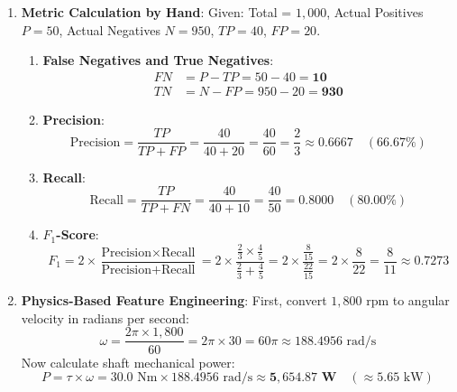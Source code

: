 \begin{enumerate}
    \item \textbf{Metric Calculation by Hand}:
    Given: Total = $1{,}000$, Actual Positives $P = 50$, Actual Negatives $N = 950$, $TP = 40$, $FP = 20$.
    \begin{enumerate}[label=(\alph*)]
        \item \textbf{False Negatives and True Negatives}:
        \begin{align*}
        FN &= P - TP = 50 - 40 = \mathbf{10} \\
        TN &= N - FP = 950 - 20 = \mathbf{930}
        \end{align*}
        \item \textbf{Precision}:
        \begin{equation*}
        \text{Precision} = \frac{TP}{TP + FP} = \frac{40}{40 + 20} = \frac{40}{60} = \frac{2}{3} \approx \mathbf{0.6667} \quad (66.67\%)
        \end{equation*}
        \item \textbf{Recall}:
        \begin{equation*}
        \text{Recall} = \frac{TP}{TP + FN} = \frac{40}{40 + 10} = \frac{40}{50} = \mathbf{0.8000} \quad (80.00\%)
        \end{equation*}
        \item \textbf{$F_1$-Score}:
        \begin{equation*}
        F_1 = 2 \times \frac{\text{Precision} \times \text{Recall}}{\text{Precision} + \text{Recall}} = 2 \times \frac{\frac{2}{3} \times \frac{4}{5}}{\frac{2}{3} + \frac{4}{5}} = 2 \times \frac{\frac{8}{15}}{\frac{22}{15}} = 2 \times \frac{8}{22} = \frac{8}{11} \approx \mathbf{0.7273}
        \end{equation*}
    \end{enumerate}

    \item \textbf{Physics-Based Feature Engineering}:
    First, convert $1{,}800\text{ rpm}$ to angular velocity in radians per second:
    \begin{equation*}
    \omega = \frac{2 \pi \times 1{,}800}{60} = 2 \pi \times 30 = 60 \pi \approx 188.4956\text{ rad/s}
    \end{equation*}
    Now calculate shaft mechanical power:
    \begin{equation*}
    P = \tau \times \omega = 30.0\text{ Nm} \times 188.4956\text{ rad/s} \approx \mathbf{5{,}654.87\text{ W}} \quad (\approx 5.65\text{ kW})
    \end{equation*}


\end{enumerate}
